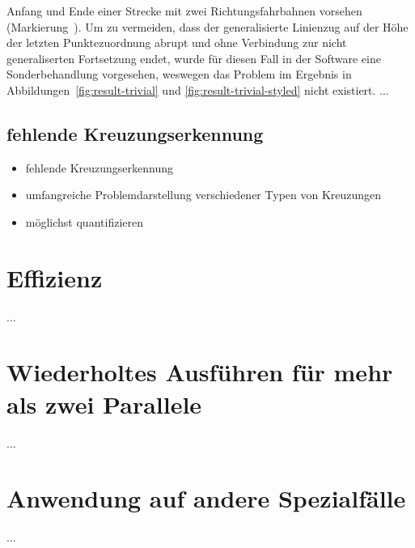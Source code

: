 \documentclass[../main/thesis.tex]{subfiles}
\begin{document}
Anfang und Ende einer Strecke mit zwei Richtungsfahrbahnen vorsehen (Markierung~).
Um zu vermeiden, dass der generalisierte Linienzug auf der Höhe der letzten Punktezuordnung abrupt und ohne Verbindung zur nicht generaliserten Fortsetzung endet, wurde für diesen Fall in der Software eine Sonderbehandlung vorgesehen, weswegen das Problem im Ergebnis in Abbildungen~\ref{fig:result-trivial} und \ref{fig:result-trivial-styled} nicht existiert.
...





\subsection{fehlende Kreuzungserkennung}

\begin{itemize}
\item fehlende Kreuzungserkennung
\item umfangreiche Problemdarstellung verschiedener Typen von Kreuzungen
\item möglichst quantifizieren
\end{itemize}



\section{Effizienz}

...



\section{Wiederholtes Ausführen für mehr als zwei Parallele}

...



\section{Anwendung auf andere Spezialfälle}

...



\end{document}
